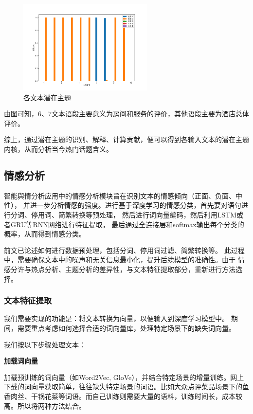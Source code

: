 \documentclass[UTF8,a4paper,15pt,titlepage,oneside]{ctexbook}
\begin{document}
    \begin{figure}[H]
      \centering
      \includegraphics[width=0.6\textwidth,keepaspectratio=false]{pictures/31.png} %
      \caption{各文本潜在主题}
      
    \end{figure}

  由图可知，6、7文本语段主要意义为房间和服务的评价，其他语段主要为酒店总体评价。

综上，通过潜在主题的识别、解释、计算贡献，便可以得到各输入文本的潜在主题内核，从而分析当今热门话题含义。


\subsection{情感分析}

智能舆情分析应用中的情感分析模块旨在识别文本的情感倾向（正面、负面、中性），
并进一步分析情感的强度。进行基于深度学习的情感分类，首先要对语句进行分词、停用词、简繁转换等预处理，
然后进行词向量编码，然后利用LSTM或者GRU等RNN网络进行特征提取，
最后通过全连接层和softmax输出每个分类的概率，从而得到情感分类。

前文已论述如何进行数据预处理，包括分词、停用词过滤、简繁转换等。
此过程中，需要确保文本中的噪声和无关信息最小化，提升后续模型的准确性。由于
情感分许与热点分析、主题分析的差异性，与文本特征提取部分，重新进行方法选择。

\subsubsection{文本特征提取}

我们需要实现的功能是：将文本转换为向量，以便输入到深度学习模型中。
期间，需要重点考虑如何选择合适的词向量库，处理特定场景下的缺失词向量。

我们按以下步骤处理文本：

\vskip 0.2cm
\noindent
\textbf{加载词向量}

加载预训练的词向量（如Word2Vec, GloVe），并结合特定场景的增量训练。网上下载的词向量获取简单，往往缺失特定场景的词语。比如大众点评菜品场景下的鱼香肉丝、干锅花菜等词语。而自己训练则需要大量的语料，训练时间长，成本较高。所以将两种方法结合。
\end{document}
